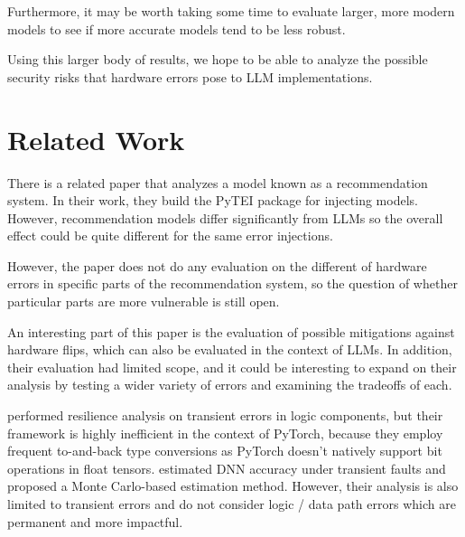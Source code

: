 \documentclass[a4paper]{article}
\begin{document}
Furthermore, it may be worth taking some time to evaluate larger, more modern models to see if more accurate models tend to be less robust.

Using this larger body of results, we hope to be able to analyze the possible security risks that hardware errors pose to LLM implementations.

\section{Related Work}
There is a related paper \cite{Ma23} that analyzes a model known as a recommendation system. In their work, they build the PyTEI package for injecting models. However, recommendation models differ significantly from LLMs so the overall effect could be quite different for the same error injections.

However, the paper does not do any evaluation on the different of hardware errors in specific parts of the recommendation system, so the question of whether particular parts are more vulnerable is still open.

An interesting part of this paper is the evaluation of possible mitigations against hardware flips, which can also be evaluated in the context of LLMs. In addition, their evaluation had limited scope, and it could be interesting to expand on their analysis by testing a wider variety of errors and examining the tradeoffs of each.

\cite{fidelity} performed resilience analysis on transient errors in logic components, but their framework is highly inefficient in the context of PyTorch, because they employ frequent to-and-back type conversions as PyTorch doesn't natively support bit operations in float tensors. \cite{thales} estimated DNN accuracy under transient faults and proposed a Monte Carlo-based estimation method. However, their analysis is also limited to transient errors and do not consider logic / data path errors which are permanent and more impactful.
\end{document}
